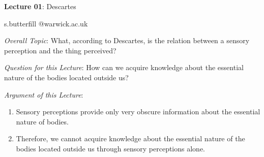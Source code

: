 \documentclass[12pt]{extarticle}
\date{}
\makeatletter
\def \ititle {Descartes}
\def \isubtitle {Lecture 01}
\def \iemail{s.butterfill @warwick.ac.uk}
\makeatother
\begin{document}
\begin{multicols*}{3}

\setlength\footnotesep{1em}









      
\def \ititle {Lecture 01}
 
\def \isubtitle {Descartes}
 
\begin{center}
 
{\Large
 
\textbf{\ititle}: \isubtitle
 
}
 
 
 
\iemail %
 
\end{center}
 
\emph{Overall Topic}:
What, according to Descartes, is the relation between a sensory perception and the thing perceived?
 
\emph{Question for this Lecture}: 
How can we acquire knowledge about the essential nature
of the bodies located outside us?
 
\emph{Argument of this Lecture}: 
\begin{enumerate}
\item Sensory perceptions provide only very obscure information about the essential nature of bodies.
\item Therefore, we cannot acquire knowledge about the essential nature of the bodies located outside us through sensory perceptions alone.
\end{enumerate}
 

\end{multicols*}
\end{document}
